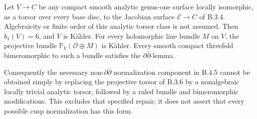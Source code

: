 \begin{proposition}\label{push:src:B.3.8}\label{push:B38}
Let $V\to C$ be any compact smooth analytic genus-one surface
locally isomorphic, as a torsor over every base disc, to the
Jacobian surface $\mathscr E\to C$ of B.3.4. Algebraicity
or finite order of this analytic torsor class is not assumed.
Then $b_1(V)=6$, and $V$ is K\"ahler. For every holomorphic
line bundle $M$ on $V$, the projective bundle
$\mathbb P_V(\mathcal O\oplus M)$ is K\"ahler. Every smooth
compact threefold bimeromorphic to such a bundle satisfies
the $\partial\bar\partial$-lemma.

Consequently the necessary non-$\partial\bar\partial$
normalization component in B.4.5 cannot be obtained simply
by replacing the projective torsor of B.3.6 by a nonalgebraic
locally trivial analytic torsor, followed by a ruled bundle
and bimeromorphic modifications. This excludes that specified
repair; it does not assert that every possible cusp
normalization has this form.
\end{proposition}
